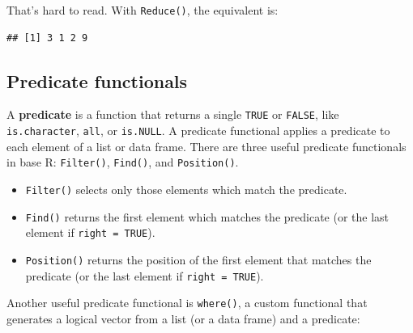 That's hard to read. With \texttt{Reduce()}, the equivalent is:

\begin{Shaded}
\begin{Highlighting}[]
\end{Highlighting}
\end{Shaded}

\begin{verbatim}
## [1] 3 1 2 9
\end{verbatim}

\hypertarget{predicate-functionals}{%
\subsection{Predicate functionals}\label{predicate-functionals}}

A \textbf{predicate} is a function that returns a single \texttt{TRUE}
or \texttt{FALSE}, like \texttt{is.character}, \texttt{all}, or
\texttt{is.NULL}. A predicate functional applies a predicate to each
element of a list or data frame. There are three useful predicate
functionals in base R: \texttt{Filter()}, \texttt{Find()}, and
\texttt{Position()}. 

\begin{itemize}
\item
  \texttt{Filter()} selects only those elements which match the
  predicate. 
\item
  \texttt{Find()} returns the first element which matches the predicate
  (or the last element if \texttt{right\ =\ TRUE}). 
\item
  \texttt{Position()} returns the position of the first element that
  matches the predicate (or the last element if
  \texttt{right\ =\ TRUE}). 
\end{itemize}

Another useful predicate functional is \texttt{where()}, a custom
functional that generates a logical vector from a list (or a data frame)
and a predicate: 

\begin{Shaded}
\begin{Highlighting}[]
\StringTok{ }
  \NormalTok{(}\NormalTok{))}
\NormalTok{\}}
\end{Highlighting}
\end{Shaded}

